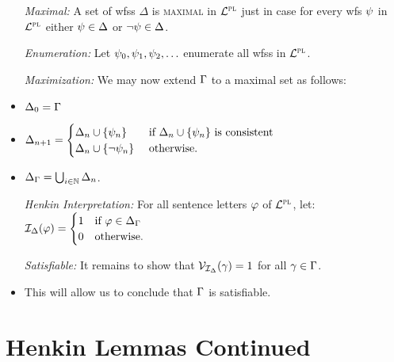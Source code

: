 \documentclass[a4paper, 11pt]{article} %
\begin{document}
\begin{itemize}
  \item[\it Maximal:] A set of wfss $\Delta$ is \textsc{maximal} in $\mathcal{L}^{\textsc{pl}}$ just in case for every wfs $\psi$ in $\mathcal{L}^{\textsc{pl}}$ either $\psi\in\Delta$ or $\neg\psi\in\Delta$.
  \item[\it Enumeration:] Let $\psi_0,\psi_1,\psi_2,\ldots$ enumerate all wfss in $\mathcal{L}^{\textsc{pl}}$.
  \item[\it Maximization:] We may now extend $\Gamma$ to a maximal set as follows: 
    \item $\Delta_0 = \Gamma$
    \item $\Delta_{n+1} =
      \begin{cases}
        \Delta_n\cup\lbrace\psi_n\rbrace      & \text{ if } \Delta_n\cup\lbrace\psi_n\rbrace \text{ is consistent}\\
        \Delta_n\cup\lbrace\neg\psi_n\rbrace  & \text{ otherwise}.
      \end{cases}$
    \item $\Delta_{\Gamma} = \bigcup_{i\in\mathbb{N}}\Delta_n$. 
  \item[\it Henkin Interpretation:] For all sentence letters $\varphi$ of $\mathcal{L}^{\textsc{pl}}$, let:~~ $\mathcal{I}_{\Delta}(\varphi) = 
    \begin{cases}
      1 & \text{if } \varphi \in \Delta_{\Gamma}\\
      0 & \text{otherwise.}
    \end{cases}$
  \item[\it Satisfiable:] It remains to show that $\mathcal{V}_{\mathcal{I}_{\Delta}}(\gamma) = 1$ for all $\gamma \in \Gamma$. 
    \item This will allow us to conclude that $\Gamma$ is satisfiable.  
\end{itemize}





  
\section*{Henkin Lemmas Continued}%
    
\end{document}
